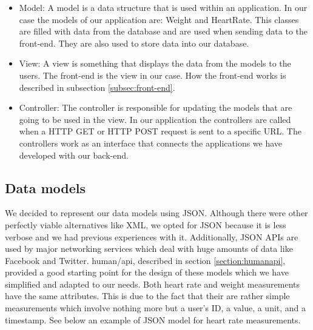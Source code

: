 \begin{itemize}

\item Model: A model is a data structure that is used within an application.
In our case the models of our application are: Weight and HeartRate.
This classes are filled with data from the database and are used when sending data to the front-end.
They are also used to store data into our database.

\item View: A view is something that displays the data from the models to the users.
The front-end is the view in our case.
How the front-end works is described in subsection \ref{subsec:front-end}.

\item Controller: The controller is responsible for updating the models that are going to be used in the view.
In our application the controllers are called when a HTTP GET or HTTP POST request is sent to a specific URL.
The controllers work as an interface that connects the applications we have developed with our back-end.

\end{itemize}

\subsection{Data models}
\label{subsec:models}

We decided to represent our data models using JSON.
Although there were other perfectly viable alternatives like XML,
we opted for JSON because it is less verbose and we had previous experiences with it.
Additionally, JSON APIs are used by major networking services which deal with huge amounts of
data like Facebook and Twitter.
human/api, described in section \ref{section:humanapi}, provided a good starting point for the design of
these models which we have simplified and adapted to our needs.
Both heart rate and weight measurements have the same attributes.
This is due to the fact that their are rather simple measurements which involve nothing more but
a user's ID, a value, a unit, and a timestamp.
See below an example of JSON model for heart rate measurements.

